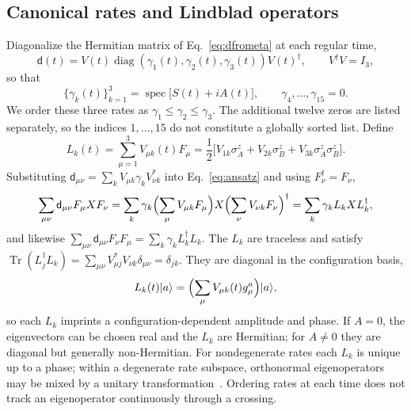\documentclass[11pt,a4paper]{article}
\newcommand{\ket}[1]{\lvert #1\rangle}
\newcommand{\Tr}{\operatorname{Tr}}
\newcommand{\diag}{\operatorname{diag}}
\newcommand{\spec}{\operatorname{spec}}
\newcommand{\dmat}{\mathsf d}
\begin{document}
\subsection{Canonical rates and Lindblad operators}
\label{sec:ratesoperators}

Diagonalize the Hermitian matrix of Eq.~\eqref{eq:dfrometa} at each
regular time,
\begin{equation}
 \dmat(t)=V(t)\diag(\gamma_1(t),\gamma_2(t),\gamma_3(t))V(t)^\dagger,
 \qquad V^\dagger V=I_3,
\end{equation}
so that
\begin{equation}
 \boxed{\{\gamma_k(t)\}_{k=1}^3=\spec\bigl[S(t)+iA(t)\bigr],\qquad
 \gamma_{4},\ldots,\gamma_{15}=0.}
 \label{eq:canonicalrates}
\end{equation}
We order these three rates as $\gamma_1\le\gamma_2\le\gamma_3$. The
additional twelve zeros are listed separately, so the indices
$1,\ldots,15$ do not constitute a globally sorted list. Define
\begin{equation}
 \boxed{L_k(t)=\sum_{\mu=1}^3V_{\mu k}(t)F_\mu
 =\frac12\bigl[V_{1k}\sigma_A^z+V_{2k}\sigma_B^z
 +V_{3k}\sigma_A^z\sigma_B^z\bigr].}
 \label{eq:lindbladops}
\end{equation}
Substituting $\dmat_{\mu\nu}=\sum_kV_{\mu k}\gamma_kV_{\nu k}^*$ into
Eq.~\eqref{eq:ansatz} and using $F_\nu^\dagger=F_\nu$,
\begin{equation}
 \sum_{\mu\nu}\dmat_{\mu\nu}F_\mu XF_\nu
 =\sum_k\gamma_k\Bigl(\sum_\mu V_{\mu k}F_\mu\Bigr)X
 \Bigl(\sum_\nu V_{\nu k}F_\nu\Bigr)^\dagger=\sum_k\gamma_kL_kXL_k^\dagger,
\end{equation}
and likewise $\sum_{\mu\nu}\dmat_{\mu\nu}F_\nu F_\mu=\sum_k\gamma_kL_k^\dagger L_k$.
The $L_k$ are traceless and satisfy
$\Tr(L_j^\dagger L_k)=\sum_{\mu\nu}V_{\mu j}^*V_{\nu k}\delta_{\mu\nu}=\delta_{jk}$.
They are diagonal in the configuration basis,
\begin{equation}
 L_k(t)\ket a=\Bigl(\sum_\mu V_{\mu k}(t)g^a_\mu\Bigr)\ket a,
 \label{eq:lindbladaction}
\end{equation}
so each $L_k$ imprints a configuration-dependent amplitude and phase.
If $A=0$, the eigenvectors can be chosen real and the $L_k$ are
Hermitian; for $A\ne0$ they are diagonal but generally non-Hermitian.
For nondegenerate rates each $L_k$ is unique up to a phase; within a
degenerate rate subspace, orthonormal eigenoperators may be mixed by
a unitary transformation~\cite{Hall2014}. Ordering rates at each time
does not track an eigenoperator continuously through a crossing.
\end{document}
